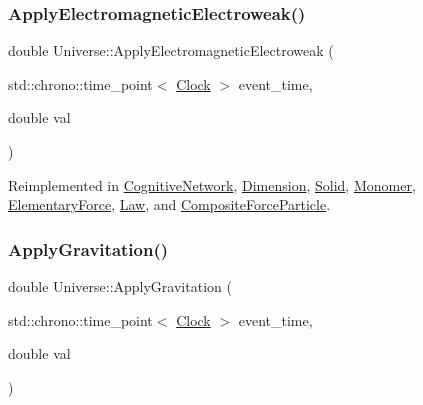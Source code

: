 \mbox{\label{classUniverse_a4c36c1ab30db993307f88363dde5e8c5}} 
\subsubsection{\texorpdfstring{Apply\+Electromagnetic\+Electroweak()}{ApplyElectromagneticElectroweak()}}
{\footnotesize\ttfamily double Universe\+::\+Apply\+Electromagnetic\+Electroweak (\begin{DoxyParamCaption}\item[{std\+::chrono\+::time\+\_\+point$<$ \mbox{\hyperlink{universe_8h_a0ef8d951d1ca5ab3cfaf7ab4c7a6fd80}{Clock}} $>$}]{event\+\_\+time,  }\item[{double}]{val }\end{DoxyParamCaption})\hspace{0.3cm}{\ttfamily [virtual]}}



Reimplemented in \mbox{\hyperlink{classCognitiveNetwork_a9753f52c9e36ad44e9fac1d3e38a0770}{Cognitive\+Network}}, \mbox{\hyperlink{classDimension_ab13e8ed50a4373274636e542c917db01}{Dimension}}, \mbox{\hyperlink{classSolid_a46702e3109994b310eb4f1fba5610e0b}{Solid}}, \mbox{\hyperlink{classMonomer_a4c3f9894ea57047789bec32602f033cb}{Monomer}}, \mbox{\hyperlink{classElementaryForce_a3764a27b11760b6ead2c8a23ff25d77a}{Elementary\+Force}}, \mbox{\hyperlink{classLaw_a4485046db890a95cea16573042a4f4f6}{Law}}, and \mbox{\hyperlink{classCompositeForceParticle_a5f6aef9e15e2e5f346c7ede76ae6458b}{Composite\+Force\+Particle}}.

\mbox{\label{classUniverse_a76c0b5e63c2a7d1988c44db341c3d64c}} 
\subsubsection{\texorpdfstring{Apply\+Gravitation()}{ApplyGravitation()}}
{\footnotesize\ttfamily double Universe\+::\+Apply\+Gravitation (\begin{DoxyParamCaption}\item[{std\+::chrono\+::time\+\_\+point$<$ \mbox{\hyperlink{universe_8h_a0ef8d951d1ca5ab3cfaf7ab4c7a6fd80}{Clock}} $>$}]{event\+\_\+time,  }\item[{double}]{val }\end{DoxyParamCaption})\hspace{0.3cm}{\ttfamily [virtual]}}



